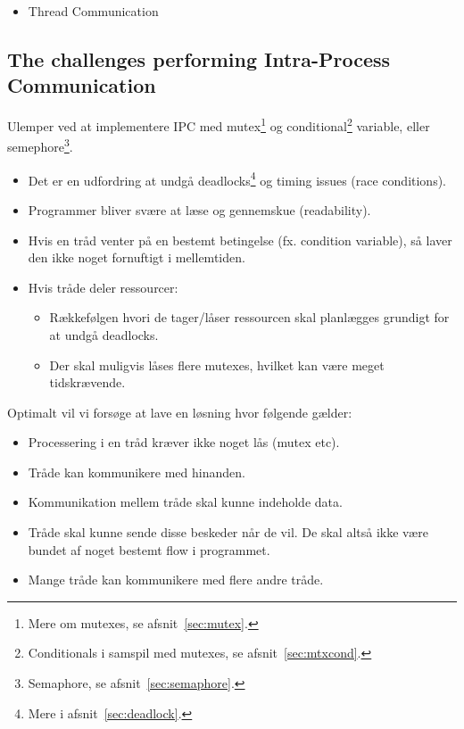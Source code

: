 \begin{itemize}
	\item Thread Communication
\end{itemize}

\subsection{The challenges performing Intra-Process Communication}\label{sec:ipc}
Ulemper ved at implementere IPC med mutex\footnote{Mere om mutexes, se afsnit~\ref{sec:mutex}.} og conditional\footnote{Conditionals i samspil med mutexes, se afsnit~\ref{sec:mtxcond}.} variable, eller semephore\footnote{Semaphore, se afsnit~\ref{sec:semaphore}.}.

\begin{itemize}
	\item Det er en udfordring at undgå deadlocks\footnote{Mere i afsnit~\ref{sec:deadlock}.} og timing issues (race conditions).
	\item Programmer bliver svære at læse og gennemskue (readability).
	\item Hvis en tråd venter på en bestemt betingelse (fx. condition variable), så laver den ikke noget fornuftigt i mellemtiden.
	\item Hvis tråde deler ressourcer:
	\begin{itemize}
		\item Rækkefølgen hvori de tager/låser ressourcen skal planlægges grundigt for at undgå deadlocks.
		\item Der skal muligvis låses flere mutexes, hvilket kan være meget tidskrævende.
	\end{itemize}
\end{itemize}

Optimalt vil vi forsøge at lave en løsning hvor følgende gælder:

\begin{itemize}
	\item Processering i en tråd kræver ikke noget lås (mutex etc). 
	\item Tråde kan kommunikere med hinanden.
	\item Kommunikation mellem tråde skal kunne indeholde data.
	\item Tråde skal kunne sende disse beskeder når de vil. De skal altså ikke være bundet af noget bestemt flow i programmet.
	\item Mange tråde kan kommunikere med flere andre tråde.
\end{itemize}

